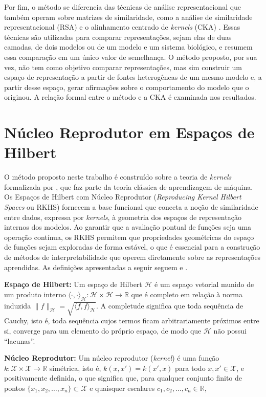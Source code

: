 Por fim, o método se diferencia das técnicas de análise representacional que também operam sobre matrizes de similaridade, como a análise de similaridade representacional (RSA) \citep{Kriegeskorte2008} e o alinhamento centrado de \textit{kernels} (CKA) \citep{Kornblith2019}. Essas técnicas são utilizadas para comparar representações, sejam elas de duas camadas, de dois modelos ou de um modelo e um sistema biológico, e resumem essa comparação em um único valor de semelhança. O método proposto, por sua vez, não tem como objetivo comparar representações, mas sim construir um espaço de representação a partir de fontes heterogêneas de um mesmo modelo e, a partir desse espaço, gerar afirmações sobre o comportamento do modelo que o originou. A relação formal entre o método e a CKA é examinada nos resultados.

\section{Núcleo Reprodutor em Espaços de Hilbert}\label{sec:rkhs}

O método proposto neste trabalho é construído sobre a teoria de \textit{kernels} formalizada por \cite{Aronszajn1950}, que faz parte da teoria clássica de aprendizagem de máquina. Os Espaços de Hilbert com Núcleo Reprodutor (\textit{Reproducing Kernel Hilbert Spaces} ou RKHS) fornecem a base funcional que conecta a noção de similaridade entre dados, expressa por \textit{kernels}, à geometria dos espaços de representação internos dos modelos. Ao garantir que a avaliação pontual de funções seja uma operação contínua, os RKHS permitem que propriedades geométricas do espaço de funções sejam exploradas de forma estável, o que é essencial para a construção de métodos de interpretabilidade que operem diretamente sobre as representações aprendidas. As definições apresentadas a seguir seguem \cite{Aronszajn1950} e \cite{Scholkopf2001}.

\textbf{Espaço de Hilbert:} Um espaço de Hilbert $\mathcal{H}$ é um espaço vetorial munido de um produto interno $\langle \cdot, \cdot \rangle_{\mathcal{H}}: \mathcal{H} \times \mathcal{H} \to \mathbb{R}$ que é completo em relação à norma induzida $\|f\|_{\mathcal{H}} = \sqrt{\langle f, f \rangle_{\mathcal{H}}}$. A completude significa que toda sequência de Cauchy, isto é, toda sequência cujos termos ficam arbitrariamente próximos entre si, converge para um elemento do próprio espaço, de modo que $\mathcal{H}$ não possui ``lacunas''.

\textbf{Núcleo Reprodutor:} Um núcleo reprodutor (\textit{kernel}) é uma função $k: \mathcal{X} \times \mathcal{X} \to \mathbb{R}$ simétrica, isto é, $k(x, x') = k(x', x)$ para todo $x, x' \in \mathcal{X}$, e positivamente definida, o que significa que, para qualquer conjunto finito de pontos $\{x_1, x_2, \dots, x_n\} \subset \mathcal{X}$ e quaisquer escalares $c_1, c_2, \dots, c_n \in \mathbb{R}$,

